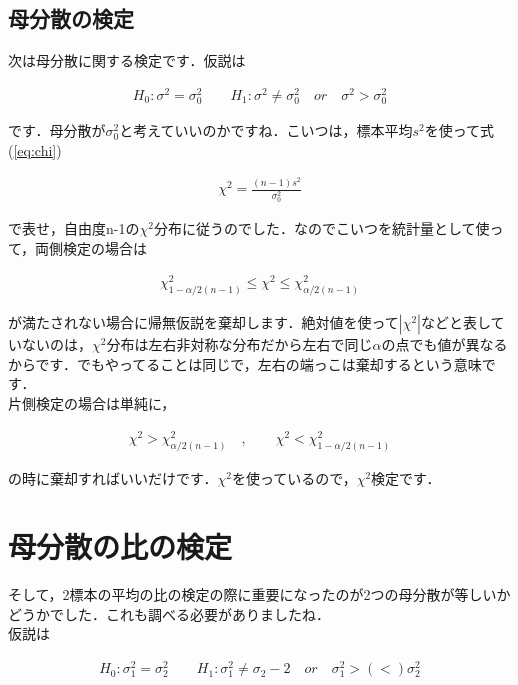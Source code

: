 \documentclass[11pt,a4paper]{ujreport} 	%
\begin{document}
\subsection{母分散の検定}
次は母分散に関する検定です．仮説は

\begin{align}
  H_0 : \sigma^2 =\sigma_0^2 \qquad H_1: \sigma^2 \neq \sigma_0^2 \quad or \quad \sigma^2 > \sigma_0^2
\end{align}

です．母分散が$\sigma_0^2$と考えていいのかですね．こいつは，標本平均$s^2$を使って式(\ref{eq:chi})

\begin{align}
  \chi^2 = \frac{(n-1)s^2}{\sigma_0^2}
\end{align}

で表せ，自由度n-1の$\chi^2$分布に従うのでした．なのでこいつを統計量として使って，両側検定の場合は

\begin{align}
  \chi^2_{1-\alpha/2(n-1)} \leq \chi^2 \leq \chi^2_{\alpha/2(n-1)}
\end{align}

が満たされない場合に帰無仮説を棄却します．絶対値を使って$|\chi^2|$などと表していないのは，$\chi^2$分布は左右非対称な分布だから左右で同じ$\alpha$の点でも値が異なるからです．でもやってることは同じで，左右の端っこは棄却するという意味です．\\

片側検定の場合は単純に，

\begin{align}
  \chi^2 > \chi^2_{\alpha/2(n-1)}\quad,　\qquad \chi^2 < \chi^2_{1-\alpha/2(n-1)} 
\end{align}

の時に棄却すればいいだけです．$\chi^2$を使っているので，$\chi^2$検定です．


\section{母分散の比の検定}
そして，2標本の平均の比の検定の際に重要になったのが2つの母分散が等しいかどうかでした．これも調べる必要がありましたね．\\

仮説は

\begin{align}
  H_0 : \sigma_1^2 = \sigma_2^2 \qquad H_1 : \sigma_1^2 \neq \sigma_2-2 \quad or \quad \sigma_1^2 >(<) \sigma_2^2
\end{align}
\end{document}
